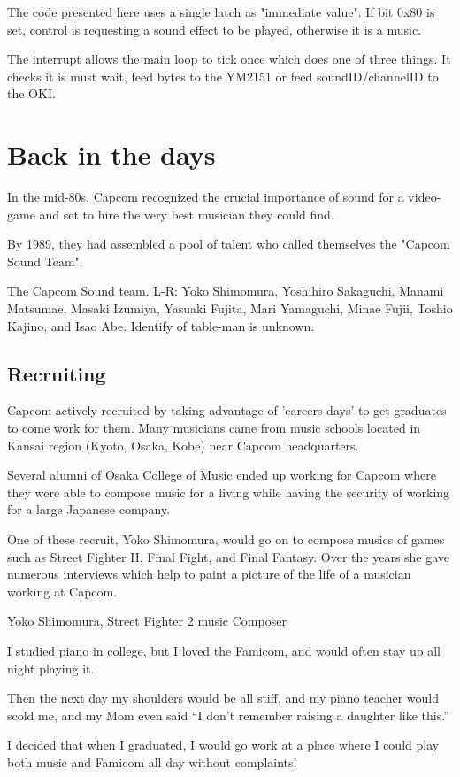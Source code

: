 

The code presented here uses a single latch as "immediate value". If bit 0x80 is set, control is requesting a sound effect to be played, otherwise it is a music. 


The interrupt allows the main loop to tick once which does one of three things. It checks it is must wait, feed bytes to the YM2151 or feed soundID/channelID to the OKI.





\section{Back in the days}
In the mid-80s, Capcom recognized the crucial importance of sound for a video-game and set to hire the very best musician they could find.

By 1989, they had assembled a pool of talent who called themselves the "Capcom Sound Team".


The Capcom Sound team. L-R: Yoko Shimomura, Yoshihiro Sakaguchi, Manami Matsumae, Masaki Izumiya, Yasuaki Fujita, Mari Yamaguchi, Minae Fujii, Toshio Kajino, and Isao Abe. Identify of table-man is unknown.

\subsection{Recruiting}
Capcom actively recruited by taking advantage of 'careers days' to get graduates to come work for them. Many musicians came from music schools located in Kansai region (Kyoto, Osaka, Kobe) near Capcom headquarters. 

Several alumni of Osaka College of Music ended up working for Capcom where they were able to compose music for a living while having the security of working for a large Japanese company. 





One of these recruit, Yoko Shimomura, would go on to compose musics of games such as Street Fighter II, Final Fight, and Final Fantasy. Over the years she gave numerous interviews which help to paint a picture of the life of a musician working at Capcom.


\begin{q}{Yoko Shimomura, Street Fighter 2 music Composer\cite{beep199010}}

I studied piano in college, but I loved the Famicom, and would often stay up all night playing it. 

Then the next day my shoulders would be all stiff, and my piano teacher would scold me, and my Mom even said “I don’t remember raising a daughter like this.”

I decided that when I graduated, I would go work at a place where I could play both music and Famicom all day without complaints!
\end{q}


